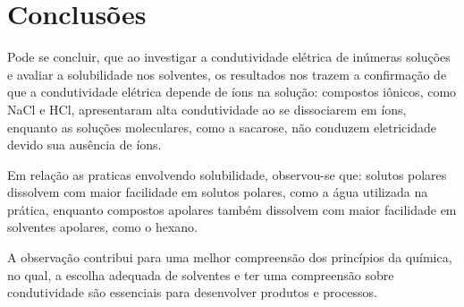 \chapter{Conclusões}

Pode se concluir, que ao investigar a condutividade elétrica de inúmeras soluções e avaliar a solubilidade nos solventes, os resultados nos trazem a confirmação de que a condutividade elétrica depende de íons na solução: compostos iônicos, como NaCl e HCl, apresentaram alta condutividade ao se dissociarem em íons, enquanto as soluções moleculares, como a sacarose, não conduzem eletricidade devido sua ausência de íons.

Em relação as praticas envolvendo solubilidade, observou-se que: solutos polares dissolvem com maior facilidade em solutos polares, como a água utilizada na prática, enquanto compostos apolares também dissolvem com maior facilidade em solventes apolares, como o hexano. 

A observação contribui para uma melhor compreensão dos princípios da química, no qual, a escolha adequada de solventes e ter uma compreensão sobre condutividade são essenciais para desenvolver produtos e processos.
